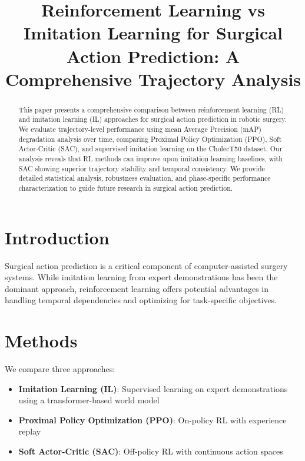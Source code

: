 \documentclass[conference]{IEEEtran}
\begin{document}
\title{Reinforcement Learning vs Imitation Learning for Surgical Action Prediction: A Comprehensive Trajectory Analysis}

\author{
}

\maketitle

\begin{abstract}
This paper presents a comprehensive comparison between reinforcement learning (RL) and imitation learning (IL) approaches for surgical action prediction in robotic surgery. We evaluate trajectory-level performance using mean Average Precision (mAP) degradation analysis over time, comparing Proximal Policy Optimization (PPO), Soft Actor-Critic (SAC), and supervised imitation learning on the CholecT50 dataset. Our analysis reveals that RL methods can improve upon imitation learning baselines, with SAC showing superior trajectory stability and temporal consistency. We provide detailed statistical analysis, robustness evaluation, and phase-specific performance characterization to guide future research in surgical action prediction.
\end{abstract}

\section{Introduction}
Surgical action prediction is a critical component of computer-assisted surgery systems. While imitation learning from expert demonstrations has been the dominant approach, reinforcement learning offers potential advantages in handling temporal dependencies and optimizing for task-specific objectives.

\section{Methods}
We compare three approaches:
\begin{itemize}
\item \textbf{Imitation Learning (IL)}: Supervised learning on expert demonstrations using a transformer-based world model
\item \textbf{Proximal Policy Optimization (PPO)}: On-policy RL with experience replay
\item \textbf{Soft Actor-Critic (SAC)}: Off-policy RL with continuous action spaces
\end{itemize}
\end{document}
